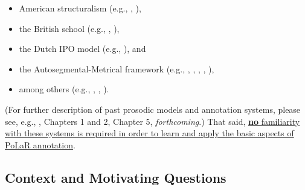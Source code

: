 \documentclass[11pt, twoside]{memoir}
\begin{document}
\begin{itemize}
\item American structuralism (e.g., \citealt{pike45}, \citealt{tragersmith51}),
\item the British school (e.g., \citealt{crystal69}, \citealt{oconnorarnold73}),
\item the Dutch IPO model (e.g., \citealt{t-hart-90}), and
\item the Autosegmental-Metrical framework (e.g., \citealt{pierrehumbert80}, \citealt{beckmanayers97}, \citealt{grabe-01}, \citealt{hualdeprieto16}, \citealt{dilleybreen18}),
\item among others (e.g., \citealt{hirst07}, \citealt{taylor98}, \citealt{xu12}).
\end{itemize}

(For further description of past prosodic models and annotation systems, please see, e.g., \citealt{roach94}, \citealt{ladd08} Chapters 1 and 2, \citealt{fery17} Chapter 5, \citeauthor{barnesshattuckhufnagel20} \textit{forthcoming}.) That said, \uline{\textbf{no} familiarity with these systems is required in order to learn and apply the basic aspects of PoLaR annotation}.

\subsection{Context and Motivating Questions}\label{sec:context-and-motivating-questions}
\end{document}
